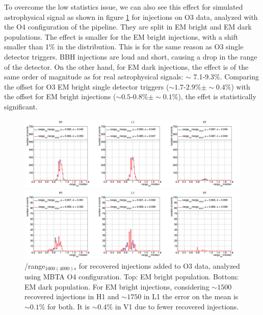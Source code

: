 To overcome the low statistics issue, we can also see this effect for simulated astrophysical signal as shown in figure \ref{fig:rangeRatioMDC} for injections on O3 data, analyzed with the O4 configuration of the pipeline.
They are split in EM bright and EM dark populations.
The effect is smaller for the EM bright injections, with a shift smaller than 1\% in the distribution.
This is for the same reason as O3 single detector triggers.
BBH injections are loud and short, causing a drop in the range of the detector.
On the other hand, for EM dark injections, the effect is of the same order of magnitude as for real astrophysical signals: $\sim$ 7.1-9.3\%.
Comparing the offset for O3 EM bright single detector triggers ($\sim 1.7\text{-}2.9\% \pm \sim 0.4\%$) with the offset for EM bright injections ($\sim 0.5\text{-}0.8\% \pm \sim 0.1\%$), the effet is statistically significant.
%
\begin{figure}
  \centering
  \begin{minipage}{\linewidth}
    \includegraphics[width=\linewidth]{sectionBadTriggers/PSD/Range/range_ratio/cRatioMed_injMDC_bright.png}
  \end{minipage}
  \begin{minipage}{\linewidth}
    \includegraphics[width=\linewidth]{sectionBadTriggers/PSD/Range/range_ratio/cRatioMed_injMDC_dark.png}
  \end{minipage}
  \caption{\medr{}/range$_{1000(4000)s}$ for recovered injections added to O3 data, analyzed using MBTA O4 configuration. Top: EM bright population. Bottom: EM dark population.
  For EM bright injections, considering $\sim 1500$ recovered injections in H1 and $\sim 1750$ in L1 the error on the mean is $\sim 0.1\%$ for both. It is $\sim 0.4\%$ in V1 due to fewer recovered injections.}
  \label{fig:rangeRatioMDC}
\end{figure}

